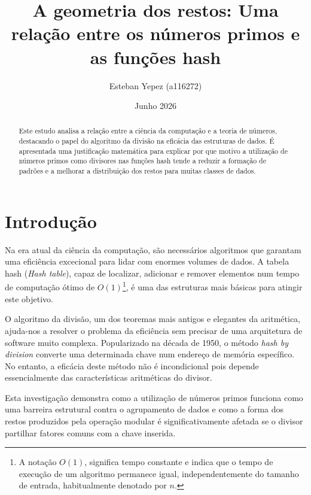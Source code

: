 \documentclass[12pt, a4paper]{article}
\title{\large A geometria dos restos: Uma relação entre os números primos e as funções hash}
\author{Esteban Yepez (a116272)}
\date{Junho 2026}
\begin{document}
\maketitle

\begin{abstract}
Este estudo analisa a relação entre a ciência da computação e a teoria de números, 
destacando o papel do algoritmo da divisão na eficácia das estruturas de
dados. É apresentada uma justificação matemática para explicar por que motivo 
a utilização de números primos como divisores nas funções hash tende a reduzir a formação
de padrões e a melhorar a distribuição dos restos para muitas classes de dados.
\end{abstract}

\section{Introdução}
Na era atual da ciência da computação, são necessários algoritmos que garantam
uma eficiência excecional para lidar com enormes volumes de dados. A tabela hash (\textit{Hash table}),
capaz de localizar, adicionar e remover elementos num tempo de computação ótimo de
$O(1)$\footnote{A notação $O(1)$, significa tempo constante e indica que o tempo de 
execução de um algoritmo permanece igual, independentemente do tamanho de entrada, habitualmente denotado por $n$.}, 
é uma das estruturas mais básicas para atingir este objetivo. 



O algoritmo da divisão, um dos teoremas mais antigos e elegantes da aritmética,
ajuda-nos a resolver o problema da eficiência sem precisar de uma arquitetura de software
muito complexa. Popularizado na década de 1950, o método \textit{hash by division}
converte uma determinada chave num endereço de memória específico. No entanto, a eficácia
deste método não é incondicional pois depende essencialmente das características aritméticas
do divisor.

Esta investigação demonstra como a utilização de números primos funciona como
uma barreira estrutural contra o agrupamento de dados e como a forma dos restos
produzidos pela operação modular é significativamente afetada se o divisor partilhar 
fatores comuns com a chave inserida.
\end{document}
